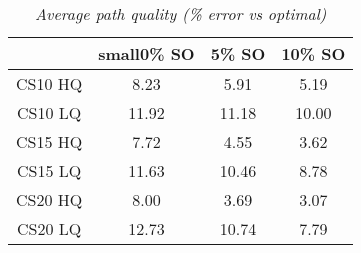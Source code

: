 \begin{table}[ht]
\begin{center}
\caption{\small{\emph{Average path quality (\% error vs optimal)}}}
\label{aha-table:pathquality}
\begin{tabular*}{0.4\textwidth}{@{\extracolsep{\fill}}cccc}%
  \hline
 & small{0\% SO} & \small{5\% SO} & \small{10\% SO} \\
  \hline
 \small{CS10 HQ} & \small{8.23} & \small{5.91} & \small{5.19} \\
 \small{CS10 LQ} & \small{11.92} & \small{11.18} & \small{10.00} \\
 \small{CS15 HQ} & \small{7.72} & \small{4.55} & \small{3.62} \\
 \small{CS15 LQ} & \small{11.63} & \small{10.46} & \small{8.78} \\
 \small{CS20 HQ} & \small{8.00} & \small{3.69} & \small{3.07} \\
 \small{CS20 LQ} & \small{12.73} & \small{10.74} & \small{7.79} \\
   \hline
\end{tabular*}
\end{center}
\end{table}
